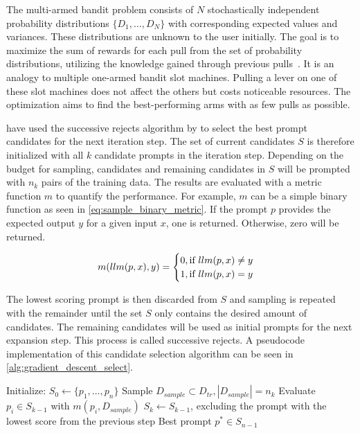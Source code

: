 The multi-armed bandit problem consists of $N$ stochastically independent probability distributions $\{ D_1, \dots, D_N\}$ with corresponding expected values and variances. These distributions are unknown to the user initially. The goal is to maximize the sum of rewards for each pull from the set of probability distributions, utilizing the knowledge gained through previous pulls~\cite{kuleshov2014AlgorithmsMultiarmeda}.
It is an analogy to multiple one-armed bandit slot machines. Pulling a lever on one of these slot machines does not affect the others but costs noticeable resources. The optimization aims to find the best-performing arms with as few pulls as possible. 

\citeauthor{pryzant2023AutomaticPrompt} have used the successive rejects algorithm by  to select the best prompt candidates for the next iteration step. The set of current candidates $S$ is therefore initialized with all $k$ candidate prompts in the iteration step. Depending on the budget for sampling, candidates and remaining candidates in $S$ will be prompted with $n_k$ pairs of the training data. The results are evaluated with a metric function $m$ to quantify the performance. For example, $m$ can be a simple binary function as seen in \autoref{eq:sample_binary_metric}. If the prompt $p$ provides the expected output $y$ for a given input $x$, one is returned. Otherwise, zero will be returned.

\begin{equation}
\label{eq:sample_binary_metric}
    m(llm(p, x), y) = 
    \begin{cases}
        0, \text{if $llm(p, x) \neq y$}\\
        1, \text{if $llm(p, x) = y$}
    \end{cases}
\end{equation}

The lowest scoring prompt is then discarded from $S$ and sampling is repeated with the remainder until the set $S$ only contains the desired amount of candidates. The remaining candidates will be used as initial prompts for the next expansion step. This process is called successive rejects. A pseudocode implementation of this candidate selection algorithm can be seen in \autoref{alg:gradient_descent_select}.


\begin{algorithm}
\caption{}
\label{alg:gradient_descent_select}
\begin{algorithmic}[1]
    \State Initialize: $S_0 \gets \{p_1, \dots , p_n\}$
        \State Sample $D_{sample} \subset D_{tr}, |D_{sample}| = n_k$
        \State Evaluate $p_i \in S_{k-1}$ with $m(p_i, D_{sample})$
        \State $S_k \gets S_{k-1}$, excluding the prompt with the lowest score from the previous step
    \EndFor
    \State \Return Best prompt $p^* \in S_{n-1}$
\end{algorithmic}
\end{algorithm}